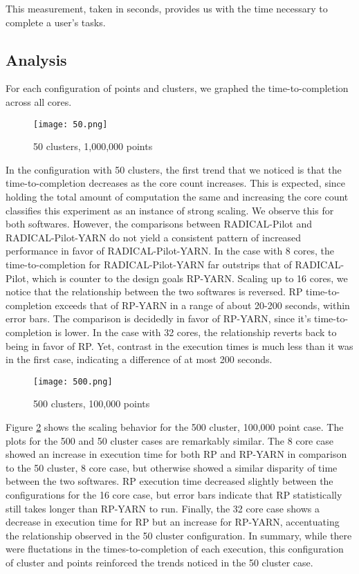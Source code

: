 \documentclass[]{article}
\begin{document}
		This measurement, taken in seconds, provides us with the time necessary to complete a user's tasks.

	\subsection{Analysis}

		For each configuration of points and clusters, we graphed the time-to-completion across all cores.

		\begin{figure}[H]
			\centering
			\texttt{[image: 50.png]}
			\caption{50 clusters, 1,000,000 points}
			\label{fig:50}
		\end{figure}

		In the configuration with 50 clusters, the first trend that we noticed is that the time-to-completion decreases as the core count increases. This is expected, since holding the total amount of computation the same and increasing the core count classifies this experiment as an instance of strong scaling. We observe this for both softwares. However, the comparisons between RADICAL-Pilot and RADICAL-Pilot-YARN do not yield a consistent pattern of increased performance in favor of RADICAL-Pilot-YARN. In the case with 8 cores, the time-to-completion for RADICAL-Pilot-YARN far outstrips that of RADICAL-Pilot, which is counter to the design goals RP-YARN. Scaling up to 16 cores, we notice that the relationship between the two softwares is reversed. RP time-to-completion exceeds that of RP-YARN in a range of about 20-200 seconds, within error bars. The comparison is decidedly in favor of RP-YARN, since it's time-to-completion is lower. In the case with 32 cores, the relationship reverts back to being in favor of RP. Yet, contrast in the execution times is much less than it was in the first case, indicating a difference of at most 200 seconds.

		\begin{figure}[H]
			\centering
			\texttt{[image: 500.png]}
			\caption{500 clusters, 100,000 points}
			\label{fig:500}
		\end{figure}

		Figure \ref{fig:500} shows the scaling behavior for the 500 cluster, 100,000 point case. The plots for the 500 and 50 cluster cases are remarkably similar. The 8 core case showed an increase in execution time for both RP and RP-YARN in comparison to the 50 cluster, 8 core case, but otherwise showed a similar disparity of time between the two softwares. RP execution time decreased slightly between the configurations for the 16 core case, but error bars indicate that RP statistically still takes longer than RP-YARN to run. Finally, the 32 core case shows a decrease in execution time for RP but an increase for RP-YARN, accentuating the relationship observed in the 50 cluster configuration. In summary, while there were fluctations in the times-to-completion of each execution, this configuration of cluster and points reinforced the trends noticed in the 50 cluster case. 
\end{document}
